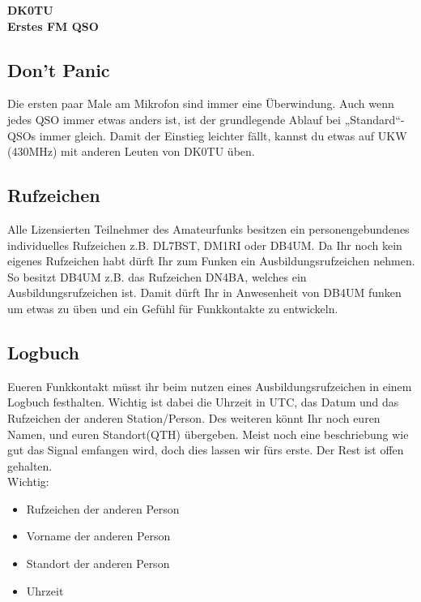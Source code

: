 \documentclass[a4paper,10pt]{article}
\begin{document}
\begin{center}
    \textbf{DK0TU \\ \parskip 8pt
            \Large Erstes FM QSO
            } \\[4em]
\end{center}

\subsection*{Don't Panic}

Die ersten paar Male am Mikrofon sind immer eine Überwindung. Auch wenn jedes QSO immer etwas anders ist, ist der grundlegende Ablauf bei „Standard“-QSOs immer gleich. Damit der Einstieg leichter fällt, kannst du etwas auf UKW (430MHz) mit anderen Leuten von DK0TU üben.

\subsection*{Rufzeichen}

Alle Lizensierten Teilnehmer des Amateurfunks besitzen ein personengebundenes individuelles Rufzeichen z.B. DL7BST, DM1RI oder DB4UM. Da Ihr noch kein eigenes Rufzeichen habt dürft Ihr zum Funken ein Ausbildungsrufzeichen nehmen. So besitzt DB4UM z.B. das Rufzeichen DN4BA, welches ein Ausbildungsrufzeichen ist. Damit dürft Ihr in Anwesenheit von DB4UM funken um etwas zu üben und ein Gefühl für Funkkontakte zu entwickeln.

\subsection*{Logbuch}

Eueren Funkkontakt müsst ihr beim nutzen eines Ausbildungsrufzeichen in einem Logbuch festhalten. Wichtig ist dabei die Uhrzeit in UTC, das Datum und das Rufzeichen der anderen Station/Person. Des weiteren könnt Ihr noch euren Namen, und euren Standort(QTH) übergeben. Meist noch eine beschriebung wie gut das Signal emfangen wird, doch dies lassen wir fürs erste. Der Rest ist offen gehalten.\\

\large Wichtig:
\begin{itemize}
    \item Rufzeichen der anderen Person
    \item Vorname der anderen Person
    \item Standort der anderen Person
    \item Uhrzeit
\end{itemize}
\end{document}
